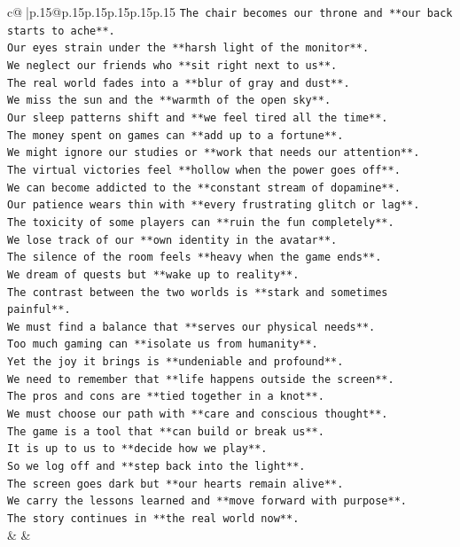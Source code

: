 \documentclass{article}
\begin{document}
{\begin{supertabular}{c@{$\;$}|p{.15\linewidth}@{}p{.15\linewidth}p{.15\linewidth}p{.15\linewidth}p{.15\linewidth}p{.15\linewidth}}
{{{\texttt{The chair becomes our throne and **our back starts to ache**.} \\
\texttt{Our eyes strain under the **harsh light of the monitor**.} \\
\texttt{We neglect our friends who **sit right next to us**.} \\
\texttt{The real world fades into a **blur of gray and dust**.} \\
\texttt{We miss the sun and the **warmth of the open sky**.} \\
\texttt{Our sleep patterns shift and **we feel tired all the time**.} \\
\texttt{The money spent on games can **add up to a fortune**.} \\
\texttt{We might ignore our studies or **work that needs our attention**.} \\
\texttt{The virtual victories feel **hollow when the power goes off**.} \\
\texttt{We can become addicted to the **constant stream of dopamine**.} \\
\texttt{Our patience wears thin with **every frustrating glitch or lag**.} \\
\texttt{The toxicity of some players can **ruin the fun completely**.} \\
\texttt{We lose track of our **own identity in the avatar**.} \\
\texttt{The silence of the room feels **heavy when the game ends**.} \\
\texttt{We dream of quests but **wake up to reality**.} \\
\texttt{The contrast between the two worlds is **stark and sometimes painful**.} \\
\texttt{We must find a balance that **serves our physical needs**.} \\
\texttt{Too much gaming can **isolate us from humanity**.} \\
\texttt{Yet the joy it brings is **undeniable and profound**.} \\
\texttt{We need to remember that **life happens outside the screen**.} \\
\texttt{The pros and cons are **tied together in a knot**.} \\
\texttt{We must choose our path with **care and conscious thought**.} \\
\texttt{The game is a tool that **can build or break us**.} \\
\texttt{It is up to us to **decide how we play**.} \\
\texttt{So we log off and **step back into the light**.} \\
\texttt{The screen goes dark but **our hearts remain alive**.} \\
\texttt{We carry the lessons learned and **move forward with purpose**.} \\
\texttt{The story continues in **the real world now**.} \\
            }
        }
    }
    & & \\ \\


\end{supertabular}}
\end{document}
